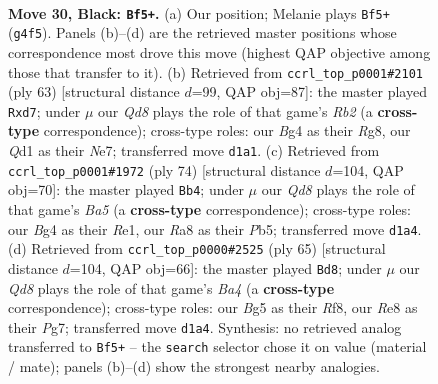\documentclass[11pt]{article}
\begin{document}
\clearpage

\begin{figure}[p]\centering
\begin{subfigure}{0.46\textwidth}\centering
\resizebox{\linewidth}{!}{%
\newchessgame
\chessboard[
  setfen={r3r3/1pp3kp/5p2/3p2b1/P5b1/N1BKP3/P2N1P2/R2q4 b - - 2 30},
  showmover=false,
  pgfstyle=straightmove, color=movearrow, markmove={g4-f5}
]}
\caption{}
\end{subfigure}\hfill
\begin{subfigure}{0.46\textwidth}\centering
\resizebox{\linewidth}{!}{%
\newchessgame
\chessboard[
  setfen={6r1/1r1Rnp2/k3p2p/P3P1p1/B7/1N1p1b1P/5PP1/1R4K1 b - - 0 32},
  showmover=false,
  pgfstyle=straightmove, color=movearrow, markmove={b7-d7}
]}
\caption{}
\end{subfigure}
\\[4pt]
\begin{subfigure}{0.46\textwidth}\centering
\resizebox{\linewidth}{!}{%
\newchessgame
\chessboard[
  setfen={2rr4/p7/1p2Rnk1/BP3p1p/5P2/P5P1/1b6/1B2R1K1 w - - 0 38},
  showmover=false,
  pgfstyle=straightmove, color=movearrow, markmove={a5-b4}
]}
\caption{}
\end{subfigure}\hfill
\begin{subfigure}{0.46\textwidth}\centering
\resizebox{\linewidth}{!}{%
\newchessgame
\chessboard[
  setfen={1r3r1k/1P4pp/R2p4/b1qNp3/2B1b3/6P1/Q4P1P/5RK1 b - - 8 33},
  showmover=false,
  pgfstyle=straightmove, color=movearrow, markmove={a5-d8}
]}
\caption{}
\end{subfigure}
\caption{\textbf{Move 30, Black: \texttt{Bf5+}.} (a) Our position; Melanie plays \texttt{Bf5+} (\texttt{g4f5}). Panels (b)--(d) are the retrieved master positions whose correspondence most drove this move (highest QAP objective among those that transfer to it). (b) Retrieved from \texttt{ccrl\_top\_p0001\#2101} (ply 63) [structural distance $d$=99, QAP obj=87]: the master played \texttt{Rxd7}; under $\mu$ our \emph{Qd8} plays the role of that game's \emph{Rb2} (a \textbf{cross-type} correspondence); cross-type roles: our \emph{B}g4 as their \emph{R}g8, our \emph{Q}d1 as their \emph{N}e7; transferred move \texttt{d1a1}. (c) Retrieved from \texttt{ccrl\_top\_p0001\#1972} (ply 74) [structural distance $d$=104, QAP obj=70]: the master played \texttt{Bb4}; under $\mu$ our \emph{Qd8} plays the role of that game's \emph{Ba5} (a \textbf{cross-type} correspondence); cross-type roles: our \emph{B}g4 as their \emph{R}e1, our \emph{R}a8 as their \emph{P}b5; transferred move \texttt{d1a4}. (d) Retrieved from \texttt{ccrl\_top\_p0000\#2525} (ply 65) [structural distance $d$=104, QAP obj=66]: the master played \texttt{Bd8}; under $\mu$ our \emph{Qd8} plays the role of that game's \emph{Ba4} (a \textbf{cross-type} correspondence); cross-type roles: our \emph{B}g5 as their \emph{R}f8, our \emph{R}e8 as their \emph{P}g7; transferred move \texttt{d1a4}. Synthesis: no retrieved analog transferred to \texttt{Bf5+} -- the \texttt{search} selector chose it on value (material / mate); panels (b)--(d) show the strongest nearby analogies.}
\label{fig:thought-m59}
\end{figure}
\end{document}
